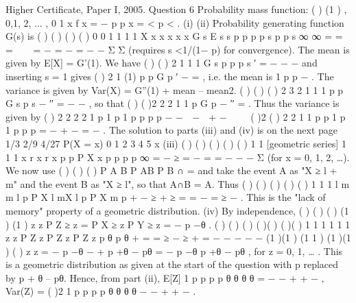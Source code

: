 \documentclass[a4paper,12pt]{article}
\begin{document}
Higher Certificate, Paper I, 2005. Question 6
Probability mass function: ( ) (1 ) , 0,1, 2, ... , 0 1 x f x = − p p x = < p < .
(i)
(ii) Probability generating function G(s) is
( ) ( ) {( ) } ( ) 0 0
1 1
1 1
X x x x
x x
G s E s s p p p p s p
p s
∞ ∞
= =
=   = − = − = − − Σ Σ
(requires s <1/(1− p) for convergence).
The mean is given by E[X] = G'(1). We have ( )
{ ( ) }2
1
1 1
G s p p
p s
′ = −
− −
and inserting
s = 1 gives ( )
2
1
(1)
p p
G
p
′ − = , i.e. the mean is 1 p
p
− .
The variance is given by Var(X) = G''(1) + mean – mean2. ( ) ( )
{ ( ) }
2
3
2 1
1 1
p p
G s
p s
−
′′ =
− −
, so
that ( ) ( )2
2
2 1
1
p
G
p
−
′′ = . Thus the variance is given by ( ) 2 2
2
2 1 p 1 p 1 p
p p p
− −  −  + − 
 
{( )2 ( )}
2 2
1 1 p p 1 p 1 p
p p
= − + − = − .
The solution to parts (iii) and (iv) is on the next page
1/3
2/9
4/27
P(X = x)
0 1 2 3 4 5
x
(iii) ( ) ( ) ( )
( ) ( ) 1
1 [geometric series] 1
1 1
x
r x
r x
p p
P X x p p p
p
∞
=
−
≥ = − = = −
− − Σ (for x =
0, 1, 2, …). We now use ( ) ( )
( )
P A B
P AB
P B
∩
= and take the event A as "X ≥ l + m"
and the event B as "X ≥ l", so that A∩B = A. Thus
( ) ( )
( )
( ) ( ) 1
1
1
l m
m
l
p
P X l mX l p P X m
p
+ −
≥ + ≥ = = − = ≥
−
.
This is the "lack of memory" property of a geometric distribution.
(iv) By independence, ( ) ( ) ( ) (1 ) (1 ) z z P Z ≥ z = P X ≥ z P Y ≥ z = − p −θ .
( ) ( ) ( ) {( )( )} {( )( )} 1 1 1 1 1 1 z z P Z z P Z z P Z z p θ p θ + = = ≥ − ≥ + = − − − − −
{(1 )(1 )} (1 1 ) {(1 )(1 )} ( ) z z = − p −θ − + p +θ − pθ = − p −θ p +θ − pθ , for z = 0, 1, … .
This is a geometric distribution as given at the start of the question with p replaced by
p + θ – pθ. Hence, from part (ii),
E[Z] 1 p p
p p
θ θ
θ θ
= − − +
+ −
, Var(Z) =
( )2
1 p p
p p
θ θ
θ θ
− − +
+ −
.
\end{document}
